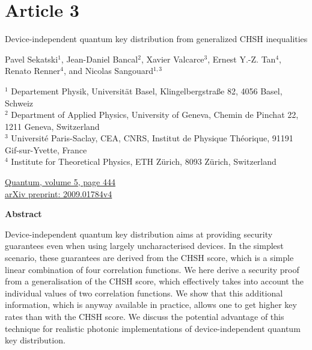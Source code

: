 \chapter*{Article 3}

\centering
\textrm{\LARGE Device-independent quantum key distribution from generalized CHSH inequalities}

\vspace{2cm}

\normalsize
Pavel Sekatski$^{1}$, Jean-Daniel Bancal$^{2}$, Xavier Valcarce$^{3}$, Ernest Y.-Z. Tan$^{4}$, Renato Renner$^{4}$, and Nicolas Sangouard$^{1,3}$
\bigbreak

{\footnotesize
	$^1$ Departement Physik, Universität Basel, Klingelbergstraße 82, 4056 Basel, Schweiz \\
	$^2$ Department of Applied Physics, University of Geneva, Chemin de Pinchat 22, 1211 Geneva, Switzerland \\
	$^3$ Université Paris-Saclay, CEA, CNRS, Institut de Physique Théorique, 91191 Gif-sur-Yvette, France \\
	$^4$ Institute for Theoretical Physics, ETH Zürich, 8093 Zürich, Switzerland
}

\raggedright
\bigbreak
\faLink \quad \href{https://quantum-journal.org/papers/q-2021-04-26-444/}{Quantum, volume 5, page 444} \\
\faLink \quad \href{https://arxiv.org/abs/2009.01784v4}{arXiv preprint: 2009.01784v4}
\vspace{1cm}

\centering
\textbf{Abstract}
\bigbreak

Device-independent quantum key distribution aims at providing security guarantees even when using largely uncharacterised devices.
In the simplest scenario, these guarantees are derived from the CHSH score, which is a simple linear combination of four correlation functions.
We here derive a security proof from a generalisation of the CHSH score, which effectively takes into account the individual values of two correlation functions.
We show that this additional information, which is anyway available in practice, allows one to get higher key rates than with the CHSH score.
We discuss the potential advantage of this technique for realistic photonic implementations of device-independent quantum key distribution.
